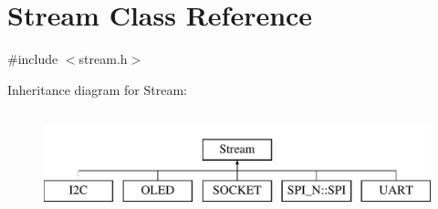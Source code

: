 \hypertarget{class_stream}{\section{Stream Class Reference}
\label{class_stream}
}


{\ttfamily \#include $<$stream.\-h$>$}

Inheritance diagram for Stream\-:\begin{figure}[H]
\begin{center}
\leavevmode
\includegraphics[height=3.000000cm]{class_stream}
\end{center}
\end{figure}
